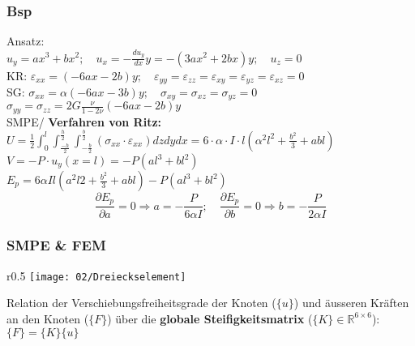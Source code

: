         \subsubsection{Bsp}
            Ansatz:\\
            $u_y=ax^3+bx^2; \quad u_x=-\frac{du_y}{dx}y= -(3ax^2+2bx)y; \quad u_z = 0$\\
            KR: $\varepsilon_{xx} =(-6ax-2b)y; \quad \varepsilon_{yy}=\varepsilon_{zz}=\varepsilon_{xy}=\varepsilon_{yz} = \varepsilon_{xz}=0$\\
            SG: $\sigma_{xx} = \alpha(-6ax-3b)y; \quad \sigma_{xy}=\sigma_{xz}=\sigma_{yz}=0$\\ $\sigma_{yy}=\sigma_{zz}=2G\frac{\nu}{1-2\nu}(-6ax-2b)y$\\
            SMPE/ \textbf{Verfahren von Ritz:}\\
            $U=\frac{1}{2}\int_0^l\int_\frac{-h}{2}^\frac{h}{2}\int_{-\frac{b}{2}}^\frac{b}{2}(\sigma_{xx}\cdot\varepsilon_{xx})dzdydx=6\cdot\alpha\cdot I\cdot l(\alpha^2l^2+\frac{b^2}{3}+abl)$\\
            $V=-P\cdot u_y(x=l)=-P(al^3+bl^2)$\\
            $E_p=6\alpha Il(a^2l2+\frac{b^2}{3}+abl)-P(al^3+bl^2)$
            \small\[\frac{\partial E_p}{\partial a} = 0 \Rightarrow a=-\frac{P}{6\alpha I};\quad\frac{\partial E_p}{\partial b} = 0 \Rightarrow b=-\frac{P}{2\alpha I}\]\normalsize
        \vspace{-3mm}    
        \subsubsection{SMPE \& FEM}
            \begin{wrapfigure}[5]{r}{0.5\linewidth}
                \vspace{-2mm}
                \texttt{[image: 02/Dreieckselement]}
            \end{wrapfigure}
            Relation der Verschiebungsfreiheitsgrade der Knoten ($\{u\}$) und äusseren Kräften an den Knoten ($\{F\}$) über die \textbf{globale Steifigkeitsmatrix} ($\{K\}\in\mathbb{R}^{6\times6}$): $\{F\}=\{K\}\{u\}$\\\\
            
